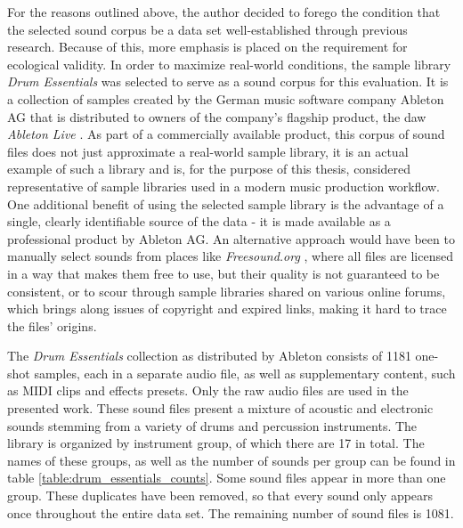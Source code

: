 \smallskip

For the reasons outlined above, the author decided to forego the condition that
the selected sound corpus be a data set well-established through previous
research. Because of this, more emphasis is placed on the requirement for
ecological validity. In order to maximize real-world conditions, the sample
library \textit{Drum Essentials} \citep{drumessentials2019} was selected to
serve as a sound corpus for this evaluation. It is a collection of samples
created by the German music software company Ableton AG that is distributed to
owners of the company's flagship product, the \gls{daw} \textit{Ableton Live}
\citep{abletonlive2019}. As part of a commercially available product, this
corpus of sound files does not just approximate a real-world sample library, it
is an actual example of such a library and is, for the purpose of this thesis,
considered representative of sample libraries used in a modern music production
workflow. One additional benefit of using the selected sample library is the
advantage of a single, clearly identifiable source of the data - it is made
available as a professional product by Ableton AG. An alternative approach would
have been to manually select sounds from places like \textit{Freesound.org}
\citep{font2013}, where all files are licensed in a way that makes them free to
use, but their quality is not guaranteed to be consistent, or to scour through
sample libraries shared on various online forums, which brings along issues of
copyright and expired links, making it hard to trace the files' origins.

\smallskip

The \textit{Drum Essentials} collection as distributed by Ableton consists of
1181 one-shot samples, each in a separate audio file, as well as supplementary
content, such as MIDI clips and effects presets. Only the raw audio files are
used in the presented work. These sound files present a mixture of acoustic
and electronic sounds stemming from a variety of drums and percussion
instruments. The library is organized by instrument group, of which there are
17 in total. The names of these groups, as well as the number of sounds per
group can be found in table \ref{table:drum_essentials_counts}. Some sound files
appear in more than one group. These duplicates have been removed, so that every
sound only appears once throughout the entire data set. The remaining number of
sound files is 1081.

\renewcommand{\arraystretch}{1.2}

